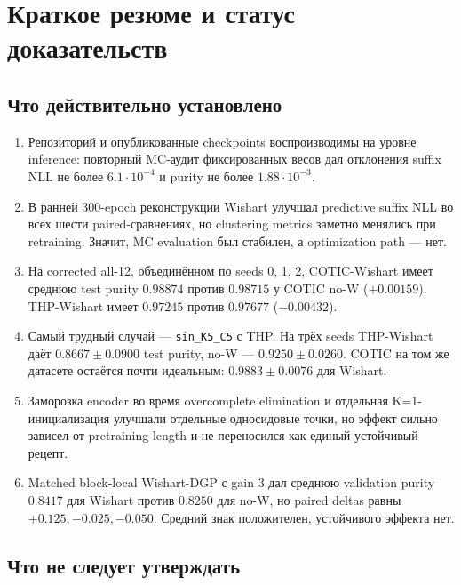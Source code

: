 \documentclass[11pt,a4paper]{article}
\newcommand{\code}[1]{\texttt{#1}}
\begin{document}
\begingroup
\footnotesize
\setlength{\parskip}{0pt}
\tableofcontents
\endgroup
\newpage

\section{Краткое резюме и статус доказательств}

\subsection{Что действительно установлено}

\begin{enumerate}
  \item Репозиторий и опубликованные checkpoints воспроизводимы на уровне
  inference: повторный MC-аудит фиксированных весов дал отклонения suffix NLL
  не более $6.1\cdot10^{-4}$ и purity не более $1.88\cdot10^{-3}$.
  \item В ранней 300-epoch реконструкции Wishart улучшал predictive suffix NLL
  во всех шести paired-сравнениях, но clustering metrics заметно менялись при
  retraining. Значит, MC evaluation был стабилен, а optimization path --- нет.
  \item На corrected all-12, объединённом по seeds 0, 1, 2, COTIC-Wishart имеет
  среднюю test purity $0.98874$ против $0.98715$ у COTIC no-W
  ($+0.00159$). THP-Wishart имеет $0.97245$ против $0.97677$
  ($-0.00432$).
  \item Самый трудный случай --- \code{sin\_K5\_C5} с THP. На трёх seeds
  THP-Wishart даёт $0.8667\pm0.0900$ test purity, no-W ---
  $0.9250\pm0.0260$. COTIC на том же датасете остаётся почти идеальным:
  $0.9883\pm0.0076$ для Wishart.
  \item Заморозка encoder во время overcomplete elimination и отдельная
  K=1-инициализация улучшали отдельные односидовые точки, но эффект сильно
  зависел от pretraining length и не переносился как единый устойчивый рецепт.
  \item Matched block-local Wishart-DGP с gain 3 дал среднюю validation purity
  $0.8417$ для Wishart против $0.8250$ для no-W, но paired deltas равны
  $+0.125,-0.025,-0.050$. Средний знак положителен, устойчивого эффекта нет.
\end{enumerate}

\subsection{Что не следует утверждать}
\end{document}
